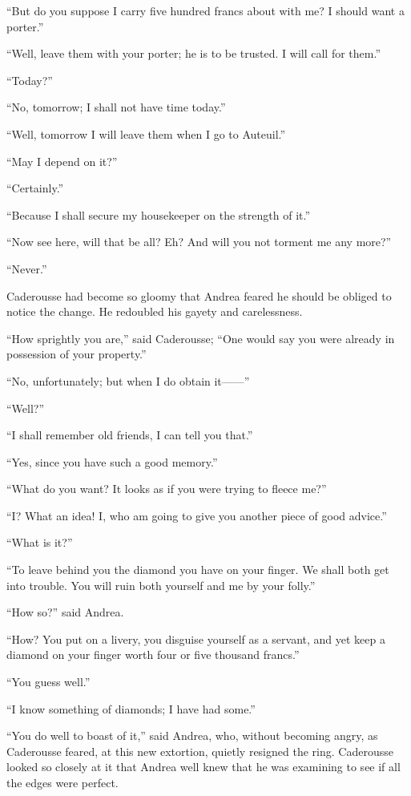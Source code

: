“But do you suppose I carry five hundred francs about with me? I should
want a porter.”

“Well, leave them with your porter; he is to be trusted. I will call
for them.”

“Today?”

“No, tomorrow; I shall not have time today.”

“Well, tomorrow I will leave them when I go to Auteuil.”

“May I depend on it?”

“Certainly.”

“Because I shall secure my housekeeper on the strength of it.”

“Now see here, will that be all? Eh? And will you not torment me any
more?”

“Never.”

Caderousse had become so gloomy that Andrea feared he should be obliged
to notice the change. He redoubled his gayety and carelessness.

“How sprightly you are,” said Caderousse; “One would say you were
already in possession of your property.”

“No, unfortunately; but when I do obtain it——”

“Well?”

“I shall remember old friends, I can tell you that.”

“Yes, since you have such a good memory.”

“What do you want? It looks as if you were trying to fleece me?”

“I? What an idea! I, who am going to give you another piece of good
advice.”

“What is it?”

“To leave behind you the diamond you have on your finger. We shall both
get into trouble. You will ruin both yourself and me by your folly.”

“How so?” said Andrea.

“How? You put on a livery, you disguise yourself as a servant, and yet
keep a diamond on your finger worth four or five thousand francs.”

“You guess well.”

“I know something of diamonds; I have had some.”

“You do well to boast of it,” said Andrea, who, without becoming angry,
as Caderousse feared, at this new extortion, quietly resigned the ring.
Caderousse looked so closely at it that Andrea well knew that he was
examining to see if all the edges were perfect.


